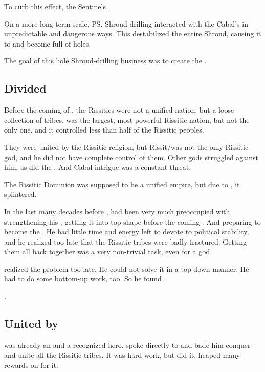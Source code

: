 To curb this effect, the Sentinels . 

On a more long-term scale, \ps{\Secherdamon} Shroud-drilling interacted with the Cabal's  in unpredictable and dangerous ways. 
This destabilized the entire Shroud, causing it to  and become full of holes. 

%
The goal of this hole Shroud-drilling business was to create the . 





\subsection{Divided}
Before the coming of , the Rissitics were not a unified nation, but a loose collection of tribes.
\Durcac was the largest, most powerful Rissitic nation, but not the only one, and it controlled less than half of the Rissitic peoples.

They were united by the Rissitic religion, but Rissit/\Secherdamon was not the only Rissitic god, and he did not have complete control of them.
Other gods struggled against him, as did the \jinn. 
And Cabal intrigue was a constant threat. 

The Rissitic Dominion was supposed to be a unified empire, but due to , it splintered.

In the last many decades before \SentinelsofMithEmph, \Secherdamon had been very much preoccupied with strengthening his \matrix, getting it into top shape before the coming \thirdbanewar.
And preparing \Vizsherioch to become the . 
He had little time and energy left to devote to political stability, and he realized too late that the Rissitic tribes were badly fractured.
Getting them all back together was a very non-trivial task, even for a god. 

\Secherdamon realized the problem too late. 
He could not solve it in a top-down manner. 
He had to do some bottom-up work, too.
So he found \Narkiza. 

. 





\subsection{United by \Narkiza}
\Narkiza was already an \Ashenoch and a recognized hero.
\Secherdamon spoke directly to \Narkiza and bade him conquer and unite all the Rissitic tribes. 
It was hard work, but \Narkiza did it.
\Secherdamon heaped many rewards on \Narkiza for it. 


